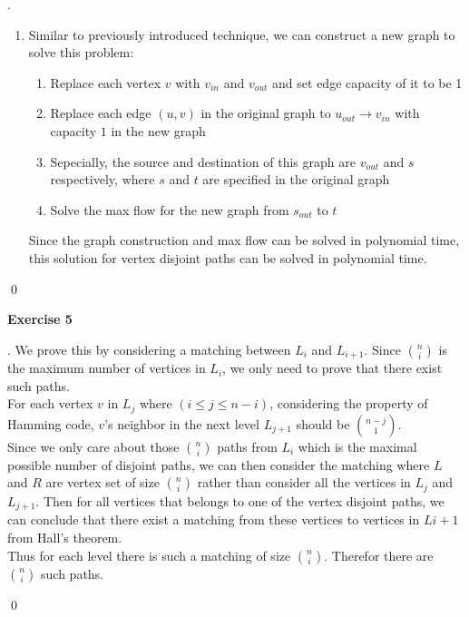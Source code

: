 \documentclass[12pt, notitlepage]{article}
\newenvironment{sol}
  {\par\vspace{3mm}\noindent{\it Solution}.}{\qed}
\begin{document}
\begin{sol}
\begin{enumerate}[1.]
\begin{figure}
\begin{subfigure}{.5\textwidth}
				\caption{converted edge capacity graph}
			\end{subfigure}
		\end{figure}
	\item Similar to previously introduced technique, we can construct a new graph to solve this problem:
		\begin{enumerate}[(1)]
			\item Replace each vertex $v$ with $v_{in}$ and $v_{out}$ and set edge capacity of it to be 1
			\item Replace each edge $(u, v)$ in the original graph to $u_{out}\rightarrow v_{in}$ with capacity $1$ in the new graph
			\item Sepecially, the source and destination of this graph are $v_{out}$ and $s$ respectively, where $s$ and $t$ are specified in the original graph
			\item Solve the max flow for the new graph from $s_{out}$ to $t$
		\end{enumerate}
		Since the graph construction and max flow can be solved in polynomial time, this solution for vertex disjoint paths can be solved in polynomial time.
	\end{enumerate}
\end{sol}


\textbf{Exercise 5}
\begin{sol}
	We prove this by considering a matching between $L_i$ and $L_{i+1}$. Since $\binom{n}{i}$ is the maximum number of vertices in $L_i$, we only need to prove that there exist such paths.\\
	For each vertex $v$ in $L_{j}$ where $(i\leq j\leq n-i)$, considering the property of Hamming code, $v$'s neighbor in the next level $L_{j+1}$ should be $\binom{n-j}{1}$.\\
	Since we only care about those $\binom{n}{i}$ paths from $L_i$ which is the maximal possible number of disjoint paths, 
	we can then consider the matching where $L$ and $R$ are vertex set of size $\binom{n}{i}$ rather than consider all the vertices in $L_j$ and $L_{j+1}$. 
	Then for all vertices that belongs to one of the vertex disjoint paths, we can conclude that there exist a matching from these vertices to vertices in $L{i+1}$ from Hall's theorem.\\
	Thus for each level there is such a matching of size $\binom{n}{i}$. Therefor there are $\binom{n}{i}$ such paths.

\end{sol}
\end{document}
